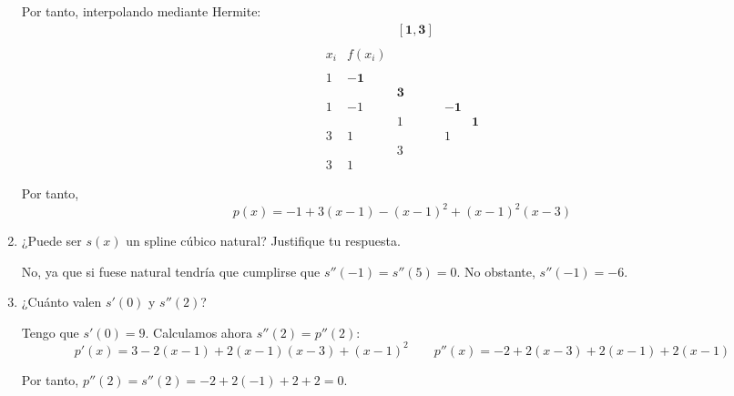 \begin{ejercicio}
\begin{enumerate}
        Por tanto, interpolando mediante Hermite:
        \begin{equation*}
            \begin{array}{c|cccc}
                &&\mathbf{[1,3]} \\ \\
                x_i & f(x_i) \\ \\
                1 & \mathbf{-1} \\
                && \mathbf{3}\\
                1 & -1 && \mathbf{-1}\\
                && 1 && \mathbf{1}\\ 
                3 & 1 && 1\\
                && 3\\
                3 & 1
            \end{array}
        \end{equation*}

        Por tanto,
        \begin{equation*}
            p(x)=-1+3(x-1)-(x-1)^2+(x-1)^2(x-3)
        \end{equation*}

        \item ¿Puede ser $s(x)$ un spline cúbico natural? Justifique tu respuesta.

        No, ya que si fuese natural tendría que cumplirse que $s''(-1)=s''(5)=0$. No obstante, $s''(-1)=-6.$

        \item ¿Cuánto valen $s'(0)$ y $s''(2)$?

        Tengo que $s'(0)=9$. Calculamos ahora $s''(2)=p''(2)$:
        \begin{equation*}
            p'(x)=3-2(x-1)+2(x-1)(x-3) +(x-1)^2
            \qquad
            p''(x)=-2+2(x-3)+2(x-1)+2(x-1)
        \end{equation*}

        Por tanto, $p''(2)=s''(2)=-2+2(-1)+2+2=0$.
    \end{enumerate}
\end{ejercicio}

